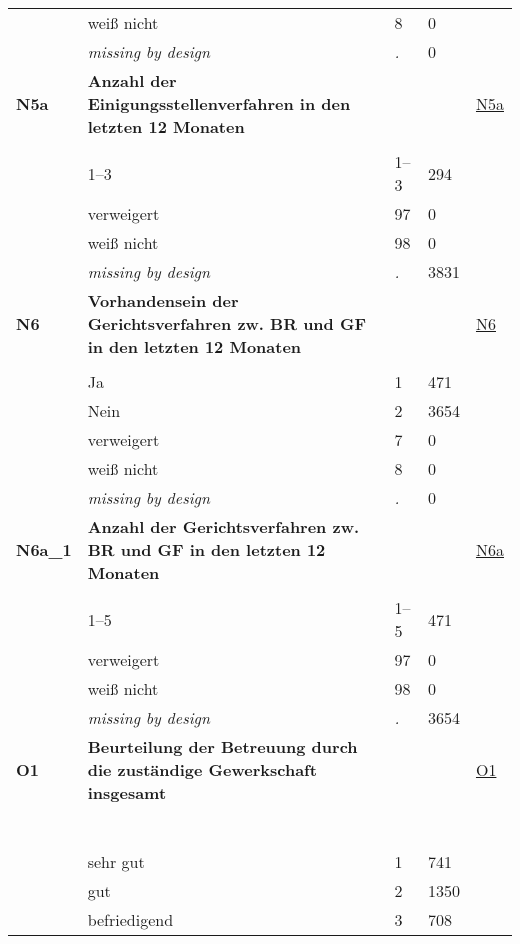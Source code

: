 \begin{longtable}{| L{2.65cm} | L{8cm} | C{1.5cm} | R{1.25cm} | C{2.25cm}  |}
   & weiß nicht & 8 & 0 &  \\ 
   & \textit{missing by design} & \textit{.} & 0 &  \\ 
   \midrule
\textbf{N5a}\label{var:N5a} & \textbf{Anzahl der Einigungsstellenverfahren in den letzten 12 Monaten} &  &  & \hyperref[N5a]{N5a} \\ 
   &  &  &  &  \\ 
   & 1--3 & 1--3 & 294 &  \\ 
   & verweigert & 97 & 0 &  \\ 
   & weiß nicht & 98 & 0 &  \\ 
   & \textit{missing by design} & \textit{.} & 3831 &  \\ 
   \midrule
\textbf{N6}\label{var:N6} & \textbf{Vorhandensein der Gerichtsverfahren zw. BR und GF in den letzten 12 Monaten} &  &  & \hyperref[N6]{N6} \\ 
   &  &  &  &  \\ 
   & Ja & 1 & 471 &  \\ 
   & Nein & 2 & 3654 &  \\ 
   & verweigert & 7 & 0 &  \\ 
   & weiß nicht & 8 & 0 &  \\ 
   & \textit{missing by design} & \textit{.} & 0 &  \\ 
   \midrule
\textbf{N6a\_1}\label{var:N6a:1} & \textbf{Anzahl der Gerichtsverfahren zw. BR und GF in den letzten 12 Monaten} &  &  & \hyperref[N6a]{N6a} \\ 
   &  &  &  &  \\ 
   & 1--5 & 1--5 & 471 &  \\ 
   & verweigert & 97 & 0 &  \\ 
   & weiß nicht & 98 & 0 &  \\ 
   & \textit{missing by design} & \textit{.} & 3654 &  \\ 
   \midrule
\textbf{O1}\label{var:O1} & \textbf{Beurteilung der Betreuung durch die zuständige Gewerkschaft insgesamt} &  &  & \hyperref[O1]{O1} \\ 
   & \protect\subsection[Variablen O1 bis Q7]{} &  &  &  \\ 
   & sehr gut & 1 & 741 &  \\ 
   & gut & 2 & 1350 &  \\ 
   & befriedigend & 3 & 708 &  \\ 

\end{longtable}
